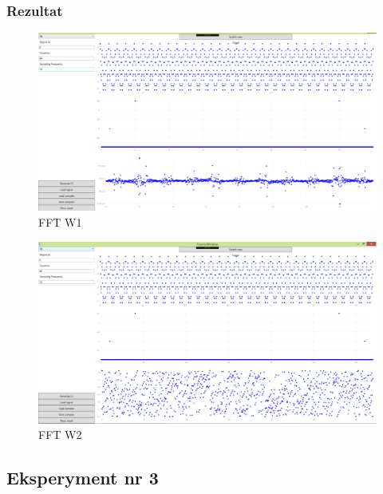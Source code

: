 \documentclass[12pt]{article}
\begin{document}
\subsubsection{Rezultat}
\begin{figure}[H]
 \centering
 \includegraphics[width=14cm]{images/fftw1.PNG}
 \vspace{-0.3cm}
 \caption{FFT W1}
 \label{gui}
\end{figure}
\begin{figure}[H]
 \centering
 \includegraphics[width=14cm]{images/fftw2.PNG}
 \vspace{-0.3cm}
 \caption{FFT W2}
 \label{gui}
\end{figure}









\subsection{Eksperyment nr 3 }
\end{document}
